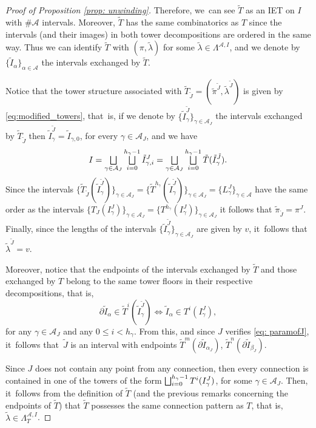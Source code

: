 \documentclass[10pt,a4paper]{amsart}
\let\oldbigsqcup\bigsqcup
\renewcommand{\bigsqcup}{\mathop{\textstyle\oldbigsqcup}\displaylimits}
\theoremstyle{plain}
\theoremstyle{definition}
\newcommand{\A}{\mathcal{A}}
\begin{document}
\begin{proof}[Proof of Proposition \ref{prop: unwinding}]
Therefore, we~can see $\tilde T$ as an IET on $I$ with $\# \A$ intervals. Moreover, $\tilde T$ has the same combinatorics as $T$ since the intervals (and their images) in both tower decompositions are ordered in the same way. Thus we can identify $\tilde T$ with $(\pi, \tilde \lambda)$ for some $\tilde \lambda \in \Lambda^{\A, I}$, and we denote by $\{\tilde I_\alpha\}_{\alpha \in \A}$ the intervals exchanged by $\tilde T$.

Notice that the tower structure associated with $\tilde T_{\tilde J} = (\tilde \pi^{\tilde J}, \tilde \lambda^{\tilde J})$ is given by \eqref{eq:modified_towers}, that~is, if we denote by $\{\tilde I_\gamma^{\tilde J}\}_{\gamma \in \A_J}$ the intervals exchanged by $\tilde T_{\tilde J}$ then $ \tilde I_\gamma^{\tilde J} = \tilde I_{\gamma, 0}$, for every $\gamma \in \A_J$, and we have
\[
 I = \bigsqcup_{\gamma \in \A_J} \bigsqcup_{i = 0}^{h_\gamma - 1} \tilde I_{\gamma, i}^J = \bigsqcup_{\gamma \in \A_J} \bigsqcup_{i = 0}^{h_\gamma - 1} \tilde T(\tilde I_{\gamma}^{\tilde J}).
\]
Since the intervals $\{\tilde T_{\tilde J}(\tilde I_\gamma^{\tilde J})\}_{\gamma \in \A_J} = \{\tilde T^{h_\gamma}(\tilde I_\gamma^{\tilde J})\}_{\gamma \in \A_J} = \{L_\gamma^J\}_{\gamma \in \A}$ have the same order as the intervals $\{T_{J}(I_\gamma^J)\}_{\gamma \in \A_J} = \{T^{h_\gamma}(I_\gamma^J)\}_{\gamma \in \A_J}$ it follows that $\tilde \pi_{\tilde J} = \pi^J$. Finally, since the lengths of the intervals $\{\tilde I_\gamma^{\tilde J}\}_{\gamma \in \A_J}$ are given by $v$, it~follows that $\tilde \lambda^{\tilde J} = v$.

Moreover, notice that the endpoints of the intervals exchanged by $\tilde T$ and those exchanged by $T$ belong to the same tower floors in their respective decompositions, that is,
\[
 \partial \tilde I_\alpha \in \tilde{T}^i(\tilde I_\gamma^{\tilde J}) \iff \tilde I_\alpha \in T^i(I^J_\gamma),
\]
for any $\gamma \in \A_J$ and any $0 \leq i < h_\gamma$. From this, and since $J$ verifies \eqref{eq: paramofJ}, it~follows that~$\tilde J$ is an interval with endpoints $\tilde T^{m}(\partial \tilde I_{\alpha_J})$, $\tilde T^n(\partial \tilde I_{\beta_J})$.

Since $J$ does not contain any point from any connection, then every connection is contained in one of the towers of the form $\bigsqcup_{i=0}^{h_{\gamma}-1}T^i(I_{\gamma}^J)$, for some $\gamma \in \A_J$. Then, it~follows from the definition of $\tilde T$ (and the previous remarks concerning the endpoints of $\tilde T$) that $\tilde T$ possesses the same connection pattern as $T$, that is, $\tilde \lambda \in \Lambda_T^{\A, I}$.
\end{proof}
\end{document}
